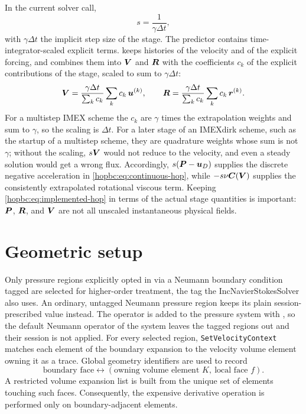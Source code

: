 In the current solver call,
\begin{equation}
  s=\frac{1}{\gamma\Delta t},
\end{equation}
with \(\gamma\Delta t\) the implicit step size of the stage.  The predictor
contains time-integrator-scaled explicit terms.  
keeps histories of the velocity and of the explicit forcing, and combines them
into \(\boldsymbol{V}\) and \(\boldsymbol{R}\) with the coefficients \(c_k\) of the explicit
contributions of the stage, scaled to sum to \(\gamma\Delta t\):
\begin{equation}
  \boldsymbol{V}=\frac{\gamma\Delta t}{\sum_k c_k}\sum_k c_k\,\boldsymbol{u}^{(k)},\qquad
  \boldsymbol{R}=\frac{\gamma\Delta t}{\sum_k c_k}\sum_k c_k\,\boldsymbol{r}^{(k)}.
\end{equation}
For a multistep IMEX scheme the \(c_k\) are \(\gamma\) times the
extrapolation weights and sum to \(\gamma\), so the scaling is \(\Delta t\).
For a later stage of an IMEXdirk scheme, such as the startup of a multistep
scheme, they are quadrature weights whose sum is not \(\gamma\); without the
scaling, \(s\boldsymbol{V}\) would not reduce to the velocity, and even a steady
solution would get a wrong flux.  Accordingly,
\(s(\boldsymbol{P}-\boldsymbol{u}_D)\) supplies the discrete negative acceleration in
\eqref{hopbc:eq:continuous-hop}, while
\(-s\nu\boldsymbol{C}(\boldsymbol{V})\) supplies the consistently extrapolated rotational
viscous term.  Keeping \eqref{hopbc:eq:implemented-hop} in terms of the actual stage
quantities is important: \(\boldsymbol{P}\), \(\boldsymbol{R}\), and \(\boldsymbol{V}\) are not
all unscaled instantaneous physical fields.

\section{Geometric setup}

Only pressure regions explicitly opted in via a Neumann boundary condition
tagged  are selected for higher-order treatment,
the tag the IncNavierStokesSolver also uses. An ordinary, untagged Neumann
pressure region keeps its plain session-prescribed value instead. The
operator is added to the pressure system with
, so the default Neumann operator of the
system leaves the tagged regions out and their session  is not
applied. For every
selected region, \texttt{SetVelocityContext} matches each element of the
boundary expansion to the velocity volume element owning it as a trace.
Global geometry identifiers are used to record
\begin{equation*}
  \text{boundary face}
  \longleftrightarrow
  (\text{owning volume element }K,\ \text{local face }f).
\end{equation*}
A restricted volume expansion list is built from the unique set of elements
touching such faces.  Consequently, the expensive derivative operation is
performed only on boundary-adjacent elements.

